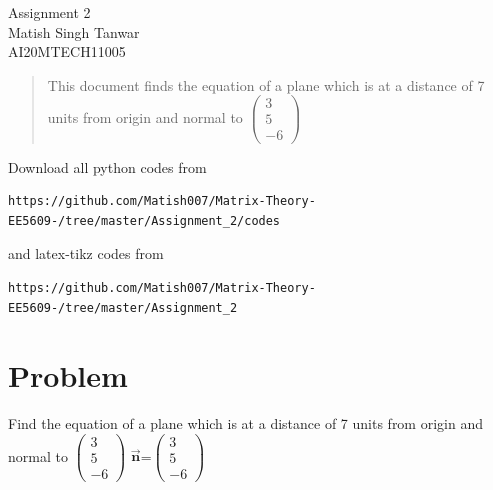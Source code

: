 \documentclass[journal,12pt,twocolumn]{IEEEtran}
\begin{document}
\begin{center}
\huge Assignment 2\\

\large Matish Singh Tanwar\\
\large AI20MTECH11005\\
\end{center}
\vspace{1.0cm}
\begin{abstract}
This document finds the equation of a plane which is at a distance of 7 units from origin and normal to $\begin{pmatrix}3\\5\\-6\end{pmatrix}$
\end{abstract}
\vspace{0.5cm}
Download all python codes from 
\begin{lstlisting}
https://github.com/Matish007/Matrix-Theory-EE5609-/tree/master/Assignment_2/codes
\end{lstlisting}
%
and latex-tikz codes from 
\begin{lstlisting}
https://github.com/Matish007/Matrix-Theory-EE5609-/tree/master/Assignment_2
\end{lstlisting}
%
\vspace{0.5mm}
\section{Problem}
Find the equation of a plane which is at a distance of 7 units from origin and normal to $\begin{pmatrix}3\\5\\-6\end{pmatrix}$
$\bm{\vec{n}}$=$\begin{pmatrix}3\\5\\-6\end{pmatrix}$\\
\end{document}
